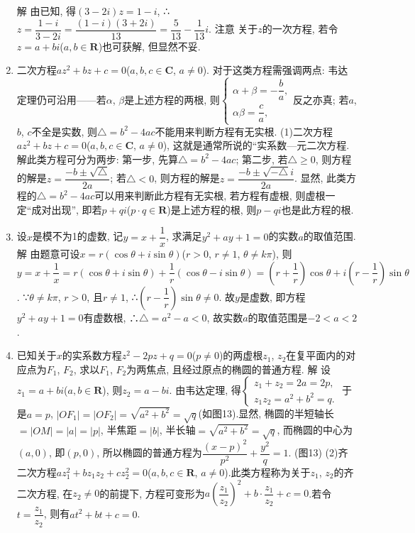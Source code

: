\documentclass[10pt,a4paper]{article}
\begin{document}
\begin{enumerate}[1.]
解  由已知, 得$(3-2i)z=1-i$, ∴$z=\dfrac{1-i}{3-2i}=\dfrac{(1-i)(3+2i)}{13}=\dfrac 5{13}-\dfrac 1{13}i$.
注意  关于$z$的一次方程, 若令$z=a+bi$($a,b\in \mathbf{R}$)也可获解, 但显然不妥.
\item 二次方程$az^2+bz+c=0$($a,b,c\in \mathbf{C}$, $a\ne 0$).
对于这类方程需强调两点:
韦达定理仍可沿用——若$\alpha$, $\beta$是上述方程的两根, 则$\begin{cases} \alpha +\beta =-\dfrac ba, \\ \alpha \beta =\dfrac ca, \end{cases}$反之亦真;
若$a$, $b$, $c$不全是实数, 则$\triangle =b^2-4ac$不能用来判断方程有无实根.
(1)二次方程$az^2+bz+c=0$($a,b,c\in \mathbf{C}$, $a\ne 0$), 这就是通常所说的``实系数—元二次方程.
解此类方程可分为两步:
第一步, 先算$\triangle =b^2-4ac$;
第二步, 若$\triangle \ge 0$, 则方程的解是$z=\dfrac{-b\pm \sqrt {\triangle }}{2a}$;
若$\triangle <0$, 则方程的解是$z=\dfrac{-b\pm \sqrt {-\triangle }i}{2a}$.
显然, 此类方程的$\triangle =b^2-4ac$可以用来判断此方程有无实根, 若方程有虚根, 则虚根一定``成对出现'', 即若$p+qi$($p\cdot q\in \mathbf{R}$)是上述方程的根, 则$p-qi$也是此方程的根.
\item 设$x$是模不为1的虚数, 记$y=x+\dfrac 1x$, 求满足$y^2+ay+1=0$的实数$a$的取值范围.
解  由题意可设$x=r(\cos \theta +i\sin \theta)$($r>0$, $r\ne 1$, $\theta \ne k\pi$),
则$y=x+\dfrac 1x=r(\cos \theta +i\sin \theta)+\dfrac 1r(\cos \theta -i\sin \theta)=(r+\dfrac 1r)\cos \theta +i(r-\dfrac 1r)\sin \theta$.
∵$\theta \ne k\pi$, $r>0$, 且$r\ne 1$, ∴$(r-\dfrac 1r)\sin \theta \ne 0$.
故$y$是虚数, 即方程$y^2+ay+1=0$有虚数根, ∴$\triangle =a^2-a<0$,
故实数$a$的取值范围是$-2<a<2$.
\item 已知关于$x$的实系数方程$z^2-2pz+q=0$($p\ne 0$)的两虚根$z_1$, $z_2$在复平面内的对应点为$F_1$, $F_2$, 求以$F_1$, $F_2$为两焦点, 且经过原点的椭圆的普通方程.
解  设$z_1=a+bi$($a,b\in \mathbf{R}$), 则$z_2=a-bi$.
由韦达定理, 得$\begin{cases} z_1+z_2=2a=2p, \\ z_1z_2=a^2+b^2=q. \end{cases}$
于是$a=p$, $|OF_1|=|OF_2|=\sqrt {a^2+b^2}=\sqrt q$(如图13).显然, 椭圆的半短轴长$=|OM|=|a|=|p|$, 半焦距$=|b|$, 半长轴$=\sqrt {a^2+b^2}=\sqrt q$, 而椭圆的中心为$(a,0)$, 即$(p,0)$, 所以椭圆的普通方程为$\dfrac{{{(x-p)}^2}}{p^2}+\dfrac{y^2}q=1$.
(图13)
(2)齐二次方程$az_1^2+bz_1z_2+cz_2^2=0$($a,b,c\in \mathbf{R}$, $a\ne 0$).此类方程称为关于$z_1$, $z_2$的齐二次方程, 在$z_2\ne 0$的前提下, 方程可变形为$a(\dfrac{z_1}{z_2})^2+b\cdot \dfrac{z_1}{z_2}+c=0$.若令$t=\dfrac{z_1}{z_2}$, 则有$at^2+bt+c=0$.

\end{enumerate}
\end{document}
